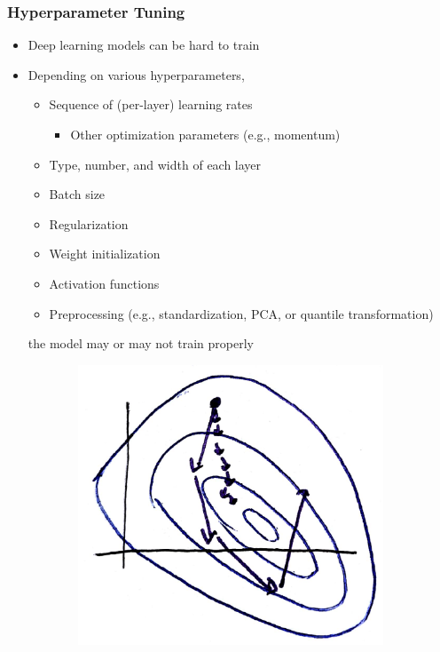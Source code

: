 \documentclass[10pt,mathserif]{beamer}
\begin{document}
\begin{frame}
  \frametitle{Hyperparameter Tuning}
  \begin{itemize}
  \item Deep learning models can be hard to train
  \item Depending on various hyperparameters,
    \begin{itemize}
    \item Sequence of (per-layer) learning rates
      \begin{itemize}
      \item Other optimization parameters (e.g., momentum)
      \end{itemize}
    \item Type, number, and width of each layer
    \item Batch size
    \item Regularization
    \item Weight initialization
    \item Activation functions
    \item Preprocessing (e.g., standardization, PCA, or quantile transformation)
    \end{itemize}
    the model may or may not train properly
  \end{itemize}
\begin{figure}[ht]
  \centering
    \begin{subfigure}{.2\paperwidth}
      \centering
      \includegraphics[width=0.17\paperwidth]{figure/learning_rate_effect}

\end{subfigure}
\end{figure}
\end{frame}
\end{document}
